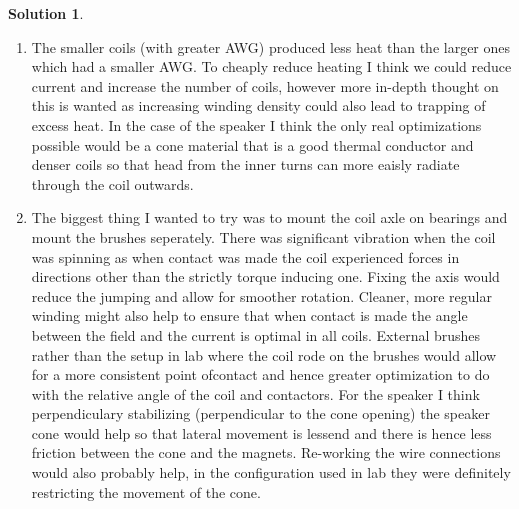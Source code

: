 \documentclass[10pt]{article}
\theoremstyle{definition}
\newtheorem{soln}{Solution}
\begin{document}
\begin{soln}
\begin{enumerate}[label=(\alph*)]
    to create a radial field where the coil sits.
    \item The smaller coils (with greater AWG) produced less heat than the larger ones which had a smaller AWG. To cheaply reduce heating I think we could reduce current
          and increase the number of coils, however more in-depth thought on this is wanted as increasing winding density could also lead to trapping of excess heat.
          In the case of the speaker I think the only real optimizations possible would be a cone material that is a good thermal conductor and denser coils so that head from the inner turns
          can more eaisly radiate through the coil outwards.
    \item The biggest thing I wanted to try was to mount the coil axle on bearings and mount the brushes seperately. There was significant
          vibration when the coil was spinning as when contact was made the coil experienced forces in directions other than the strictly torque inducing one.
          Fixing the axis would reduce the jumping and allow for smoother rotation. Cleaner, more regular winding might also help to ensure that when contact is made
          the angle between the field and the current is optimal in all coils. External brushes rather than the setup in lab where the coil rode on the brushes
          would allow for a more consistent point ofcontact and hence greater optimization to do with the relative angle of the coil and contactors.
          For the speaker I think perpendiculary stabilizing (perpendicular to the cone opening) the speaker cone would help so that lateral movement is lessend and 
          there is hence less friction between the cone and the magnets. Re-working the wire connections would also probably help, in the configuration used in lab they were
          definitely restricting the movement of the cone.
  \end{enumerate}
\end{soln}
\end{document}
